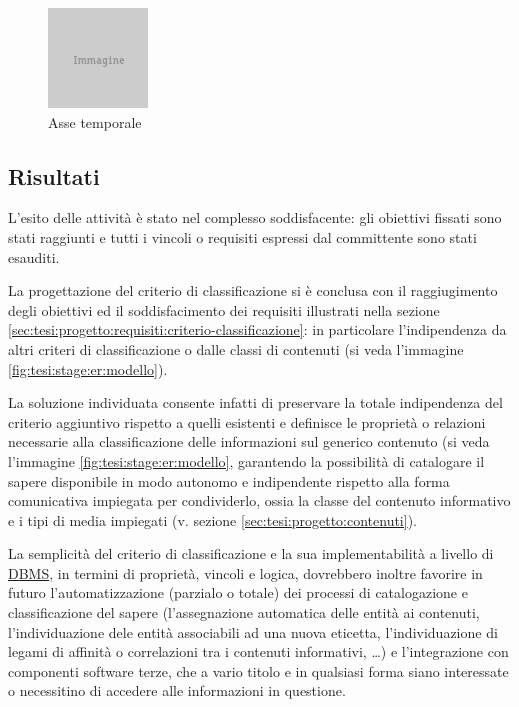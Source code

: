 \begin{figure}[ht]
	\begin{center}
		\includegraphics{placeholder.png}
		\caption{Asse temporale}
		\label{fig:tesi:stage:design:timeline}
	\end{center}
\end{figure}

\subsection{Risultati}
L'esito delle attività è stato nel complesso soddisfacente: gli obiettivi fissati sono stati raggiunti e tutti i vincoli o requisiti espressi dal committente sono stati esauditi.

La progettazione del criterio di classificazione si è conclusa con il raggiugimento degli obiettivi ed il soddisfacimento dei requisiti illustrati nella sezione \ref{sec:tesi:progetto:requisiti:criterio-classificazione}: in particolare l'indipendenza da altri criteri di classificazione o dalle classi di contenuti (si veda l'immagine \ref{fig:tesi:stage:er:modello}).

La soluzione individuata consente infatti di preservare la totale indipendenza del criterio aggiuntivo rispetto a quelli esistenti e definisce le proprietà o relazioni necessarie alla classificazione delle informazioni sul generico contenuto (si veda l'immagine \ref{fig:tesi:stage:er:modello}, garantendo la possibilità di catalogare il sapere disponibile in modo autonomo e indipendente rispetto alla forma comunicativa impiegata per condividerlo, ossia la classe del contenuto informativo e i tipi di media impiegati (v. sezione \ref{sec:tesi:progetto:contenuti}).

La semplicità del criterio di classificazione e la sua implementabilità a livello di \underline{DBMS}, in termini di proprietà, vincoli e logica, dovrebbero inoltre favorire in futuro l'automatizzazione (parzialo o totale) dei processi di catalogazione e classificazione del sapere (l'assegnazione automatica delle entità ai contenuti, l'individuazione dele entità associabili ad una nuova eticetta, l'individuazione di legami di affinità o correlazioni tra i contenuti informativi, \ldots) e l'integrazione con componenti software terze, che a vario titolo e in qualsiasi forma siano interessate o necessitino di accedere alle informazioni in questione.

